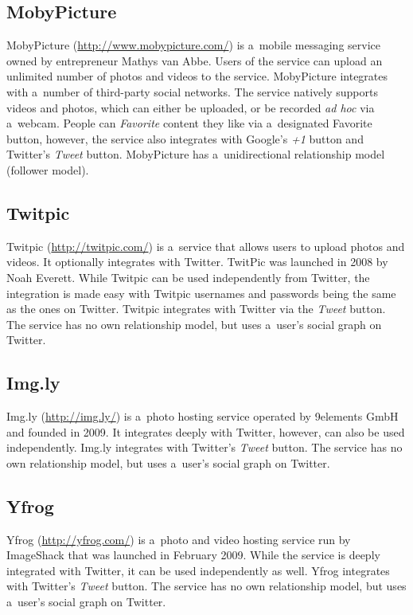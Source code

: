 \subsection{MobyPicture}

MobyPicture (\url{http://www.mobypicture.com/})
is a~mobile messaging service
owned by entrepreneur Mathys van Abbe.
Users of the service can upload an unlimited number of
photos and videos to the service.
MobyPicture integrates with a~number of
third-party social networks.
The service natively supports videos and photos,
which can either be uploaded, or be recorded \emph{ad hoc}
via a~webcam.
People can \emph{Favorite} content they like via
a~designated Favorite button,
however, the service also integrates with Google's
\emph{+1} button and Twitter's \emph{Tweet} button. 
MobyPicture has a~unidirectional relationship model
(follower model).

\subsection{Twitpic}

Twitpic (\url{http://twitpic.com/})
is a~service that allows users to upload photos and videos.
It optionally integrates with Twitter.
TwitPic was launched in 2008 by Noah Everett.
While Twitpic can be used independently from Twitter,
the integration is made easy with Twitpic usernames and passwords
being the same as the ones on Twitter.
Twitpic integrates with Twitter via the \emph{Tweet} button.
The service has no own relationship model,
but uses a~user's social graph on Twitter.

\subsection{Img.ly}

Img.ly (\url{http://img.ly/})
is a~photo hosting service operated by 9elements GmbH
and founded in 2009.
It integrates deeply with Twitter, however,
can also be used independently.
Img.ly integrates with Twitter's \emph{Tweet} button. 
The service has no own relationship model,
but uses a~user's social graph on Twitter.

\subsection{Yfrog}

Yfrog (\url{http://yfrog.com/})
is a~photo and video hosting service run by ImageShack
that was launched in February 2009.
While the service is deeply integrated with Twitter,
it can be used independently as well.
Yfrog integrates with Twitter's \emph{Tweet} button.
The service has no own relationship model,
but uses a~user's social graph on Twitter.

